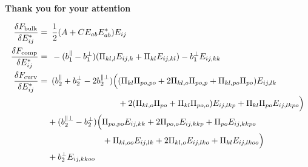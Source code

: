 \documentclass[10pt,mathserif]{beamer}
\begin{document}
\begin{frame}[fragile]
    \newrefsection
    \vspace{4em}
    \begin{center}
        \LARGE
        \textbf{Thank you for your attention}
    \end{center}
    \vspace{2em}
    \footnotesize
    \color{gray}
    \begin{align*}
        \fdv{F_\text{bulk}}{E_{ij}^*} =&\enspace \frac{1}{2}\qty(A + C E_{ab}E_{ab}^*)E_{ij} \\
        \fdv{F_\text{comp}}{E_{ij}^*} =&\enspace -(b_1^\parallel - b_1^\perp) (\Pi_{kl,l} E_{ij,k} + \Pi_{kl} E_{ij,kl}) - b_1^\perp E_{ij,kk} \\
        \fdv{F_\text{curv}}{E_{ij}^*} =&\enspace (b_2^\parallel + b_2^\perp - 2b_2^{\parallel\perp}) \Bigl( (\Pi_{kl}\Pi_{po,po} + 2\Pi_{kl,o}\Pi_{po,p} + \Pi_{kl,po}\Pi_{po})E_{ij,lk} \\
        &\phantom{\enspace (b_2^\parallel + b_2^\perp - 2b_2^{\parallel\perp}) \Bigl(}+ 2(\Pi_{kl,o}\Pi_{po} + \Pi_{kl}\Pi_{po,o})E_{ij,lkp} + \Pi_{kl}\Pi_{po}E_{ij,lkpo} \Bigr) \nonumber \\
        &+ (b_2^{\parallel\perp} - b_2^\perp)\Bigl( \Pi_{po,po}E_{ij,kk} + 2\Pi_{po,o}E_{ij,kkp} + \Pi_{po}E_{ij,kkpo} \nonumber \\ 
        &\phantom{\enspace+ (b_2^{\parallel\perp} - b_2^\perp)\Bigl(}+ \Pi_{kl,oo}E_{ij,lk} + 2\Pi_{kl,o}E_{ij,lko} + \Pi_{kl}E_{ij,lkoo} \Bigr) \nonumber \\ 
        &+ b_2^\perp E_{ij,kkoo} \nonumber
    \end{align*}
    \normalcolor\normalsize
\end{frame}
\end{document}
